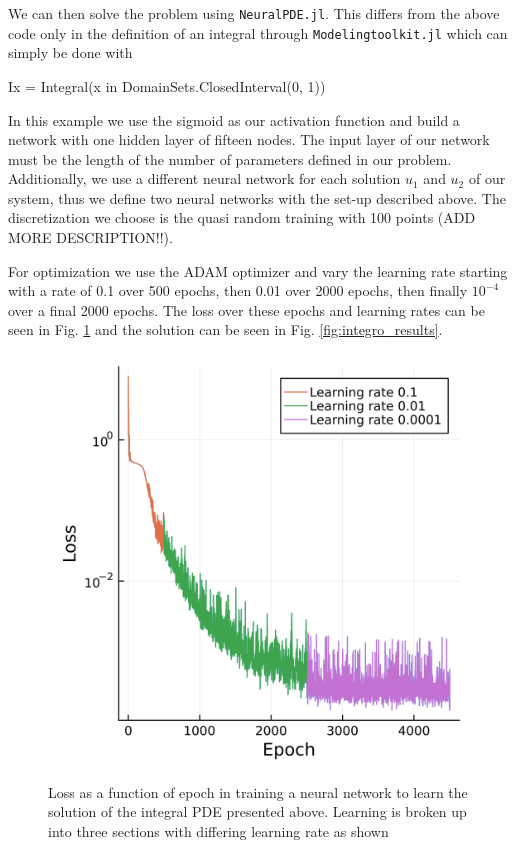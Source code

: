 \documentclass{CUP-JNL-DTM}%
\theoremstyle{definition}
\numberwithin{equation}{section}
\begin{document}
We can then solve the problem using \texttt{NeuralPDE.jl}. This differs from the above code only in the definition of an integral through \texttt{Modelingtoolkit.jl} which can simply be done with

\begin{jllisting}
Ix = Integral(x in DomainSets.ClosedInterval(0, 1))
\end{jllisting}

In this example we use the sigmoid as our activation function and build a network with one hidden layer of fifteen nodes. The input layer of our network must be the length of the number of parameters defined in our problem. Additionally, we use a different neural network for each solution $u_1$ and $u_2$ of our system, thus we define two neural networks with the set-up described above. The discretization we choose is the quasi random training with 100 points (ADD MORE DESCRIPTION!!). 

For optimization we use the ADAM optimizer and vary the learning rate starting with a rate of 0.1 over 500 epochs, then 0.01 over 2000 epochs, then finally $10^{-4}$ over a final 2000 epochs. The loss over these epochs and learning rates can be seen in Fig. \ref{fig:loss_integro} and the solution can be seen in Fig. \ref{fig:integro_results}.

\begin{figure}
\centering
    \includegraphics[width=0.3\linewidth]{figures/integral_PDE_plots/loss.png}
    \caption{Loss as a function of epoch in training a neural network to learn the solution of the integral PDE presented above. Learning is broken up into three sections with differing learning rate as shown}
    \label{fig:loss_integro}
\end{figure}
\end{document}
